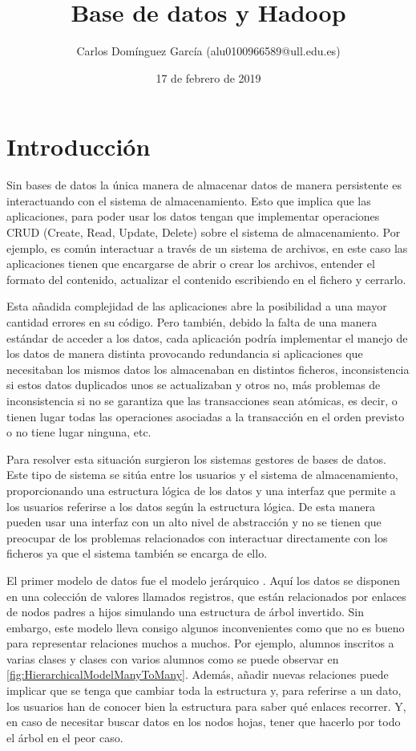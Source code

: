 \documentclass[12pt]{article}
\title{Base de datos y Hadoop}
\author{Carlos Domínguez García (alu0100966589@ull.edu.es)}
\date{17 de febrero de 2019}
\begin{document}
  \maketitle
  \pagebreak
  
  \tableofcontents
  \pagebreak

  \section{Introducción}
    Sin bases de datos la única manera de almacenar datos de manera persistente es interactuando con el sistema de almacenamiento. Esto que implica que las aplicaciones, para poder usar los datos tengan que implementar operaciones CRUD (Create, Read, Update, Delete) sobre el sistema de almacenamiento. Por ejemplo, es común interactuar a través de un sistema de archivos, en este caso las aplicaciones tienen que encargarse de abrir o crear los archivos, entender el formato del contenido, actualizar el contenido escribiendo en el fichero y cerrarlo.

    Esta añadida complejidad de las aplicaciones abre la posibilidad a una mayor cantidad errores en su código. Pero también, debido la falta de una manera estándar de acceder a los datos, cada aplicación podría implementar el manejo de los datos de manera distinta provocando redundancia si aplicaciones que necesitaban los mismos datos los almacenaban en distintos ficheros, inconsistencia si estos datos duplicados unos se actualizaban y otros no, más problemas de inconsistencia si no se garantiza que las transacciones sean atómicas, es decir, o tienen lugar todas las operaciones asociadas a la transacción en el orden previsto o no tiene lugar ninguna, etc. \cite{MariaDB_EarlyDatabaseModels}

    Para resolver esta situación surgieron los sistemas gestores de bases de datos. Este tipo de sistema se sitúa entre los usuarios y el sistema de almacenamiento, proporcionando una estructura lógica de los datos y una interfaz que permite a los usuarios referirse a los datos según la estructura lógica. De esta manera pueden usar una interfaz con un alto nivel de abstracción y no se tienen que preocupar de los problemas relacionados con interactuar directamente con los ficheros ya que el sistema también se encarga de ello.
    
    El primer modelo de datos fue el modelo jerárquico \cite{MariaDB_HierarchicalDatabaseModel}. Aquí los datos se disponen en una colección de valores llamados registros, que están relacionados por enlaces de nodos padres a hijos simulando una estructura de árbol invertido. Sin embargo, este modelo lleva consigo algunos inconvenientes como que no es bueno para representar relaciones muchos a muchos. Por ejemplo, alumnos inscritos a varias clases y clases con varios alumnos como se puede observar en \cref{fig:HierarchicalModelManyToMany}. Además, añadir nuevas relaciones puede implicar que se tenga que cambiar toda la estructura y, para referirse a un dato, los usuarios han de conocer bien la estructura para saber qué enlaces recorrer. Y, en caso de necesitar buscar datos en los nodos hojas, tener que hacerlo por todo el árbol en el peor caso.
\end{document}
